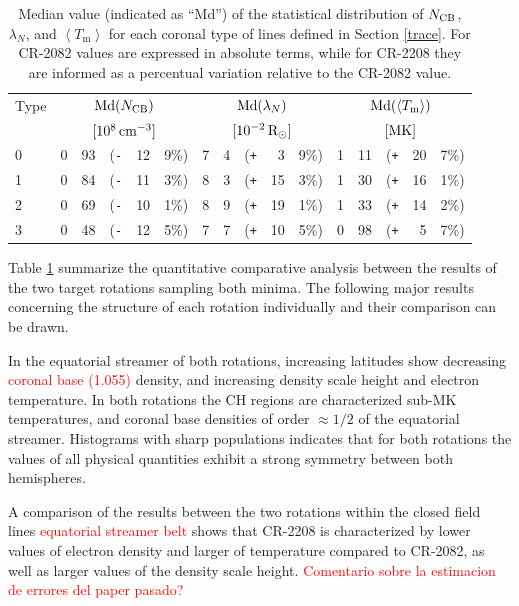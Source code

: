 \documentclass[namedreferences]{solarphysics}
\newcommand{\mrsun}{{\rm R_\odot}}
\newcommand{\med}{{\rm Md}}
\newcommand{\avgTe}{\left<T_\textrm{m}\right>}
\newcommand{\MK}{{\rm MK}}
\newcommand{\lN}{\lambda_N}
\newcommand{\NCB}{N_{\rm CB}}
\newcommand{\aTm}{\left< T_\textrm{m}\right>}
\def\Pl{\texttt{+}}
\def\Mi{\texttt{-}}
\begin{document}
\begin{article}
\begin{table}
\begin{tabular}{l r@{.}l@{\hskip 0.05in} r@{\hskip 0.01in} r@{.}l  r@{.}l@{\hskip 0.05in} r@{\hskip 0.01in} r@{.}l r@{.}l@{\hskip 0.05in} r@{\hskip 0.01in} r@{.}l }
\hline
Type    & \multicolumn{5}{c}{$\med(\NCB)$}             & \multicolumn{5}{c}{$\med(\lN)$} & \multicolumn{5}{c}{$\med(\avgTe)$} \\
       & \multicolumn{5}{c}{$[10^8\,{\rm cm}^{-3}]$}  & \multicolumn{5}{c}{$[{\rm 10}^{-2}\,\mrsun]$} & \multicolumn{5}{c}{$[\MK]$} \\
\hline
0  & 0&93 &(\Mi&12&9\%)  &   7&4 &(\Pl&~3&9\%) &   1&11 &(\Pl&20&7\%) \\
1  & 0&84 &(\Mi&11&3\%)  &   8&3 &(\Pl&15&3\%) &   1&30 &(\Pl&16&1\%) \\
2  & 0&69 &(\Mi&10&1\%)  &   8&9 &(\Pl&19&1\%) &   1&33 &(\Pl&14&2\%) \\
3  & 0&48 &(\Mi&12&5\%)  &   7&7 &(\Pl&10&5\%) &   0&98 &(\Pl&~5&7\%) \\
\hline          
\end{tabular}
\caption{Median value (indicated as ``Md'') of the statistical distribution of $\NCB$, $\lN$, and $\aTm$ for each coronal type of lines defined in Section \ref{trace}. For CR-2082 values are expressed in absolute terms, while for CR-2208 they are informed as a percentual variation relative to the CR-2082 value.}
\label{tabla_demt}
\end{table}


Table \ref{tabla_demt} summarize the quantitative comparative analysis between the results of the two target rotations sampling both minima. The following major results concerning the structure of each rotation individually and their comparison can be drawn.

In the equatorial streamer of both rotations, increasing latitudes show decreasing \textcolor{red}{coronal base (1.055)} density, and increasing density scale height and electron temperature. In both rotations the CH regions are characterized sub-MK temperatures, and coronal base densities of order $\approx 1/2$ of the equatorial streamer. Histograms with sharp populations indicates that for both rotations the values of all physical quantities exhibit a strong symmetry between both hemispheres.

A comparison of the results between the two rotations within the closed field lines \textcolor{red}{equatorial streamer belt} shows that CR-2208 is characterized by lower values of electron density and larger of temperature compared to CR-2082, as well as larger values of the density scale height.
\textcolor{red}{Comentario sobre la estimacion de errores del paper pasado?}


\end{article}
\end{document}
